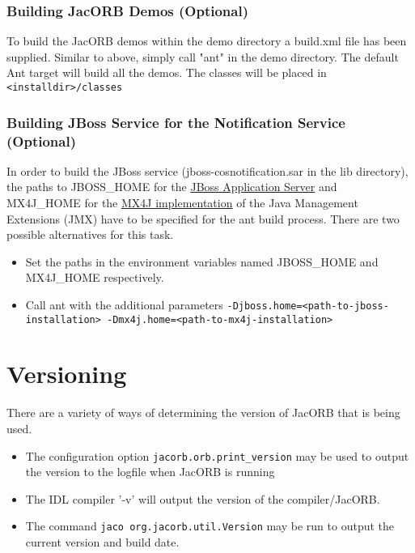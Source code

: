 \subsubsection{Building JacORB Demos (Optional)}
To build the JacORB demos within the demo directory a build.xml file
has been supplied. Similar to above, simply call "ant" in the demo directory.
The default Ant target will build all the demos. The classes will be placed
in {\tt <installdir>/classes}

\subsubsection{Building JBoss Service for the Notification Service (Optional)}
In order to build the JBoss service (jboss-cosnotification.sar in the lib
directory), the paths to JBOSS\_HOME for the
\href{http://www.jboss.org/jbossas}{JBoss Application Server} and MX4J\_HOME
for the \href{http://mx4j.sourceforge.net}{MX4J implementation}
 of the Java Management Extensions (JMX) have to be specified for the ant build
process. There are two possible alternatives for this task.
\begin{itemize}
\item Set the paths in the environment variables named JBOSS\_HOME and MX4J\_HOME respectively.
\item Call ant with the additional parameters {\tt -Djboss.home=<path-to-jboss-installation> -Dmx4j.home=<path-to-mx4j-installation>}
\end{itemize}


\section{Versioning}
There are a variety of ways of determining the version of JacORB that is being used.
\begin{itemize}
\item The configuration option {\tt jacorb.orb.print\_version} may be used to output the version to the logfile when JacORB is running
\item The IDL compiler '-v' will output the version of the compiler/JacORB.
\item The command {\tt jaco org.jacorb.util.Version} may be run to output the current version and build date.
\end{itemize}

